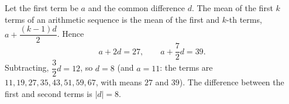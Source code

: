 Let the first term be $a$ and the common difference $d$. The mean of the first $k$ terms of an arithmetic sequence is the mean of the first and $k$-th terms, $a+\dfrac{(k-1)d}{2}$. Hence
\[
a+2d=27,\qquad a+\dfrac{7}{2}d=39 .
\]
Subtracting, $\dfrac{3}{2}d=12$, so $d=8$ (and $a=11$: the terms are $11,19,27,35,43,51,59,67$, with means $27$ and $39$). The difference between the first and second terms is $|d|=\boxed{8}$.
